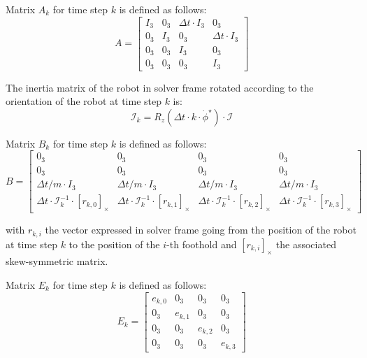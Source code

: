 \documentclass[a4paper,11pt]{article}
\begin{document}
Matrix $A_k$ for time step $k$ is defined as follows:
\begin{equation}
A = \begin{bmatrix} 
I_3 & 0_3 & \Delta t \cdot I_3 & 0_3 \\
0_3 & I_3 & 0_3 & \Delta t \cdot I_3 \\
0_3 & 0_3 & I_3 & 0_3 \\
0_3 & 0_3 & 0_3 & I_3
\end{bmatrix}
\end{equation}


The inertia matrix of the robot in solver frame rotated according to the orientation of the robot at time step $k$ is:
\begin{equation}
\mathcal{I}_k = R_z(\Delta t \cdot k \cdot \dot \phi^\star) \cdot \mathcal{I}
\end{equation}

Matrix $B_k$ for time step $k$ is defined as follows:
\begin{equation}
B = \begin{bmatrix} 
0_3 & 0_3 & 0_3 & 0_3 \\
0_3 & 0_3 & 0_3 & 0_3 \\
\Delta t/m \cdot I_3 & \Delta t/m \cdot I_3 & \Delta t/m \cdot I_3 & \Delta t/m \cdot I_3 \\
\Delta t \cdot \mathcal{I}_k^{-1} \cdot [r_{k,0}]_\times & \Delta t \cdot \mathcal{I}_k^{-1} \cdot [r_{k,1}]_\times & \Delta t \cdot \mathcal{I}_k^{-1} \cdot [r_{k,2}]_\times & \Delta t \cdot \mathcal{I}_k^{-1} \cdot [r_{k,3}]_\times
\end{bmatrix}
\end{equation}

with $r_{k,i}$ the vector expressed in solver frame going from the position of the robot at time step $k$ to the position of the $i$-th foothold and $[r_{k,i}]_\times$ the associated skew-symmetric matrix.

Matrix $E_k$ for time step $k$ is defined as follows:
\begin{equation}
E_k = \begin{bmatrix} 
e_{k,0} & 0_3 & 0_3 & 0_3 \\
0_3 & e_{k,1} & 0_3 & 0_3 \\
0_3 & 0_3 & e_{k,2} & 0_3 \\
0_3 & 0_3 & 0_3 & e_{k,3}
\end{bmatrix}
\end{equation}
\end{document}
